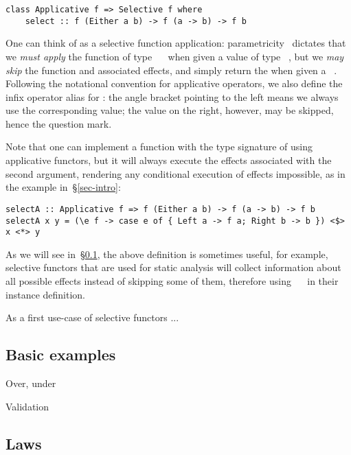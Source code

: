 \begin{verbatim}
class Applicative f => Selective f where
    select :: f (Either a b) -> f (a -> b) -> f b
\end{verbatim}

\noindent
One can think of  as a selective function application:
parametricity~\citep{wadler1989theorems} dictates that we \emph{must apply} the
function of type ~\hs{->}~ when given a value of type
~, but we \emph{may skip} the function and associated effects,
and simply return the  when given a ~. Following the
notational convention for applicative operators, we also define the infix
operator alias  for : the angle bracket pointing to the left
means we always use the corresponding value; the value on the right, however,
may be skipped, hence the question mark.

Note that one can implement a function with the type signature of 
using applicative functors, but it will always execute the effects associated
with the second argument, rendering any conditional execution of effects
impossible, as in the  example in~\S\ref{sec-intro}:

\begin{verbatim}
selectA :: Applicative f => f (Either a b) -> f (a -> b) -> f b
selectA x y = (\e f -> case e of { Left a -> f a; Right b -> b }) <$> x <*> y
\end{verbatim}

\noindent
As we will see in~\S\ref{sec-instances}, the above definition is sometimes
useful, for example, selective functors that are used for static analysis will
collect information about all possible effects instead of skipping some of them,
therefore using ~\hs{=}~ in their instance definition.


As a first use-case of selective functors ...



\subsection{Basic examples}\label{sec-instances}

Over, under

Validation

\subsection{Laws}\label{sec-laws}

